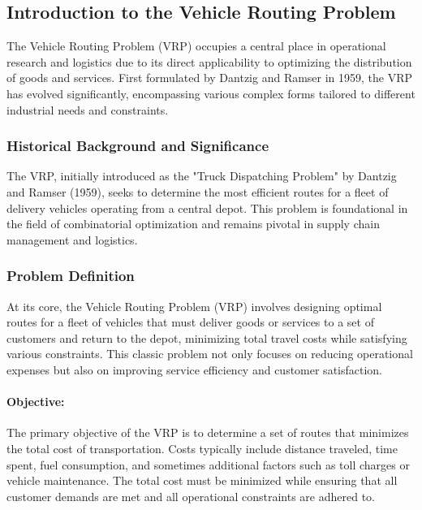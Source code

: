\documentclass{article}
\begin{document}
    \subsection{Introduction to the Vehicle Routing Problem}\label{introduction-to-the-vehicle-routing-problem}

    The Vehicle Routing Problem (VRP) occupies a central place in operational research and logistics due to its direct applicability to optimizing the distribution of goods and services. First formulated by Dantzig and Ramser in 1959, the VRP has evolved significantly, encompassing various complex forms tailored to different industrial needs and constraints.\cite{dantzig1959truck}

    \subsubsection{Historical Background and Significance}\label{subsubsec:historical-background-and-significance}
    The VRP, initially introduced as the "Truck Dispatching Problem" by Dantzig and Ramser (1959), seeks to determine the most efficient routes for a fleet of delivery vehicles operating from a central depot. This problem is foundational in the field of combinatorial optimization and remains pivotal in supply chain management and logistics.
    \cite{dantzig1959truck}

    \subsubsection{Problem Definition}\label{subsubsec:problem_definition}


    At its core, the Vehicle Routing Problem (VRP) involves designing optimal routes for a fleet of vehicles that must deliver goods or services to a set of customers and return to the depot, minimizing total travel costs while satisfying various constraints. This classic problem not only focuses on reducing operational expenses but also on improving service efficiency and customer satisfaction.\cite[p. 1--3]{toth2014vehicle}

    \paragraph{Objective:}
    The primary objective of the VRP is to determine a set of routes that minimizes the total cost of transportation. Costs typically include distance traveled, time spent, fuel consumption, and sometimes additional factors such as toll charges or vehicle maintenance. The total cost must be minimized while ensuring that all customer demands are met and all operational constraints are adhered to.  \cite[p. 3--4]{toth2014vehicle}
\end{document}
